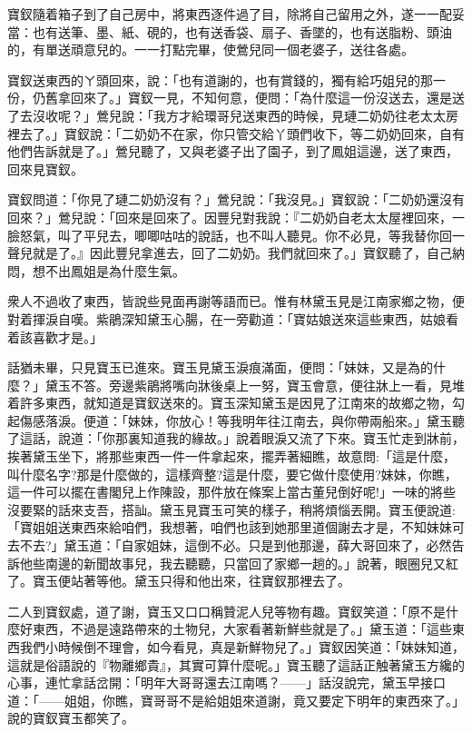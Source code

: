 寶釵隨着箱子到了自己房中，將東西逐件過了目，除將自己留用之外，遂一一配妥當：也有送筆、墨、紙、硯的，也有送香袋、扇子、香墜的，也有送脂粉、頭油的，有單送頑意兒的。一一打點完畢，使鶯兒同一個老婆子，送往各處。

寶釵送東西的ㄚ頭回來，說：「也有道謝的，也有賞錢的，獨有給巧姐兒的那一份，仍舊拿回來了。」寶釵一見，不知何意，便問：「為什麼這一份沒送去，還是送了去沒收呢？」鶯兒說：「我方才給環哥兒送東西的時候，見璉二奶奶往老太太房裡去了。」寶釵說：「二奶奶不在家，你只管交給丫頭們收下，等二奶奶回來，自有他們告訴就是了。」鶯兒聽了，又與老婆子出了園子，到了鳳姐這邊，送了東西，回來見寶釵。

寶釵問道：「你見了璉二奶奶沒有？」鶯兒說：「我沒見。」寶釵說：「二奶奶還沒有回來？」鶯兒說：「回來是回來了。因豐兒對我說：『二奶奶自老太太屋裡回來，一臉怒氣，叫了平兒去，唧唧咕咕的說話，也不叫人聽見。你不必見，等我替你回一聲兒就是了。』因此豐兒拿進去，回了二奶奶。我們就回來了。」寶釵聽了，自己納悶，想不出鳳姐是為什麼生氣。

衆人不過收了東西，皆說些見面再謝等語而已。惟有林黛玉見是江南家鄉之物，便對着揮淚自嘆。紫鵑深知黛玉心腸，在一旁勸道：「寶姑娘送來這些東西，姑娘看着該喜歡才是。」

話猶未畢，只見寶玉已進來。寶玉見黛玉淚痕滿面，便問：「妹妹，又是為的什麼？」黛玉不答。旁邊紫鵑將嘴向牀後桌上一努，寶玉會意，便往牀上一看，見堆着許多東西，就知道是寶釵送來的。寶玉深知黛玉是因見了江南來的故鄉之物，勾起傷感落淚。便道：「妹妹，你放心！等我明年往江南去，與你帶兩船來。」黛玉聽了這話，說道：「你那裏知道我的緣故。」說着眼淚又流了下來。寶玉忙走到牀前，挨著黛玉坐下，將那些東西一件一件拿起來，擺弄著細瞧，故意問:「這是什麼，叫什麼名字?那是什麼做的，這樣齊整?這是什麼，要它做什麼使用?妹妹，你瞧，這一件可以擺在書閣兒上作陳設，那件放在條案上當古董兒倒好呢!」一味的將些沒要緊的話來支吾，搭訕。黛玉見寶玉可笑的樣子，稍將煩惱丟開。寶玉便說道:「寶姐姐送東西來給咱們，我想著，咱們也該到她那里道個謝去才是，不知妹妹可去不去?」黛玉道：「自家姐妹，這倒不必。只是到他那邊，薛大哥回來了，必然告訴他些南邊的新聞故事兒，我去聽聽，只當回了家鄉一趟的。」說著，眼圈兒又紅了。寶玉便站著等他。黛玉只得和他出來，往寶釵那裡去了。

二人到寶釵處，道了謝，寶玉又口口稱贊泥人兒等物有趣。寶釵笑道：「原不是什麼好東西，不過是遠路帶來的土物兒，大家看著新鮮些就是了。」黛玉道：「這些東西我們小時候倒不理會，如今看見，真是新鮮物兒了。」寶釵因笑道：「妹妹知道，這就是俗語說的『物離鄉貴』，其實可算什麼呢。」寶玉聽了這話正触著黛玉方纔的心事，連忙拿話岔開：「明年大哥哥還去江南嗎？——」話沒說完，黛玉早接口道：「——姐姐，你瞧，寶哥哥不是給姐姐來道謝，竟又要定下明年的東西來了。」說的寶釵寶玉都笑了。

